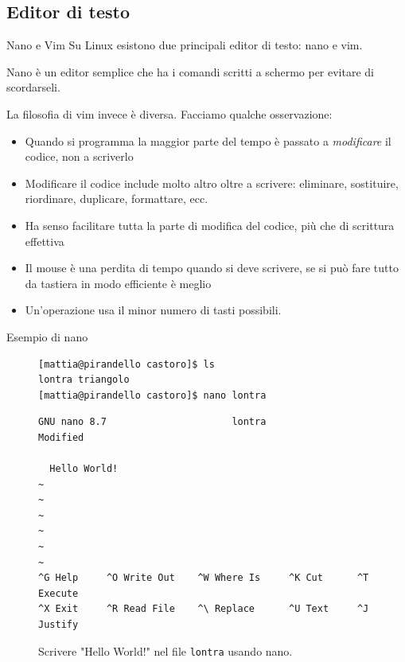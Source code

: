 \subsection{Editor di testo}
\begin{frame}[fragile]{Nano e Vim}
  Su Linux esistono due principali editor di testo: nano e vim. \smallskip

  Nano è un editor semplice che ha i comandi scritti a schermo per evitare di
  scordarseli. \smallskip

  La filosofia di vim invece è diversa. Facciamo qualche osservazione:
  \begin{itemize}
    \item Quando si programma la maggior parte del tempo è passato a 
      \textit{modificare} il codice, non a scriverlo

    \item Modificare il codice include molto altro oltre a scrivere: eliminare,
      sostituire, riordinare, duplicare, formattare, ecc.

    \item Ha senso facilitare tutta la parte di modifica del codice, più che 
      di scrittura effettiva

    \item Il mouse è una perdita di tempo quando si deve scrivere, se si può
      fare tutto da tastiera in modo efficiente è meglio

    \item Un'operazione usa il minor numero di tasti possibili.
  \end{itemize}
\end{frame}

\begin{frame}[fragile]{Esempio di nano}
  \begin{figure}
    \begin{lstlisting}[basicstyle=\footnotesize]
[mattia@pirandello castoro]$ ls
lontra triangolo
[mattia@pirandello castoro]$ nano lontra
  \end{lstlisting}
  \end{figure}
  \begin{figure}
    \begin{lstlisting}[basicstyle=\tiny\ttfamily, frame=single, rulecolor=\color{black}]
  GNU nano 8.7                      lontra                      Modified  

  Hello World!
~
~
~
~
~
~
^G Help     ^O Write Out    ^W Where Is     ^K Cut      ^T Execute
^X Exit     ^R Read File    ^\ Replace      ^U Text     ^J Justify
    \end{lstlisting}
    \caption{Scrivere "Hello World!" nel file \texttt{lontra} usando nano.}
  \end{figure}
\end{frame}


